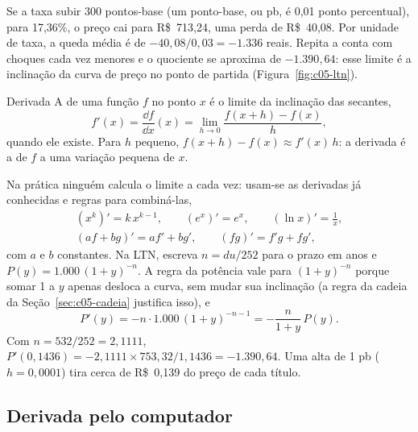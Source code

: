 Se a taxa subir 300 pontos-base (um ponto-base, ou pb, é 0,01 ponto percentual), para 17,36\%, o preço cai para R\$~713,24, uma perda de R\$~40,08. Por unidade de taxa, a queda média é de $-40,08/0,03 = -1.336$ reais. Repita a conta com choques cada vez menores e o quociente se aproxima de $-1.390,64$: esse limite é a inclinação da curva de preço no ponto de partida (Figura~\ref{fig:c05-ltn}).


\begin{definicao}{Derivada}
A  de uma função $f$ no ponto $x$ é o limite da inclinação das secantes,
\begin{equation}
  f'(x) = \frac{\dd f}{\dd x}(x) = \lim_{h \to 0} \frac{f(x+h) - f(x)}{h} ,
  \label{eq:c05-derivada}
\end{equation}
quando ele existe. Para $h$ pequeno, $f(x+h) - f(x) \approx f'(x)\,h$: a derivada é a  de $f$ a uma variação pequena de $x$.
\end{definicao}

Na prática ninguém calcula o limite a cada vez: usam-se as derivadas já conhecidas e regras para combiná-las,
\begin{gather*}
  (x^k)' = k\,x^{k-1} , \qquad (e^{x})' = e^{x} , \qquad (\ln x)' = \frac{1}{x} , \\
  (a f + b g)' = a f' + b g' , \qquad (f g)' = f' g + f g' ,
\end{gather*}
com $a$ e $b$ constantes. Na LTN, escreva $n = du/252$ para o prazo em anos e $P(y) = 1.000\,(1+y)^{-n}$. A regra da potência vale para $(1+y)^{-n}$ porque somar 1 a $y$ apenas desloca a curva, sem mudar sua inclinação (a regra da cadeia da Seção~\ref{sec:c05-cadeia} justifica isso), e
\begin{equation}
  P'(y) = -n \cdot 1.000\,(1+y)^{-n-1} = -\frac{n}{1+y}\,P(y) .
  \label{eq:c05-dltn}
\end{equation}
Com $n = 532/252 = 2,1111$, $P'(0,1436) = -2,1111 \times 753,32 / 1,1436 = -1.390,64$. Uma alta de 1 pb ($h = 0,0001$) tira cerca de R\$~0,139 do preço de cada título.

\subsection{Derivada pelo computador}

